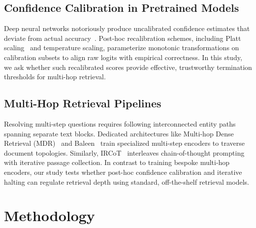 \documentclass{article}
\begin{document}
\subsection{Confidence Calibration in Pretrained Models}
Deep neural networks notoriously produce uncalibrated confidence estimates that deviate from actual accuracy~\cite{guo2017calibration}. Post-hoc recalibration schemes, including Platt scaling~\cite{platt1999probabilistic} and temperature scaling, parameterize monotonic transformations on calibration subsets to align raw logits with empirical correctness. In this study, we ask whether such recalibrated scores provide effective, trustworthy termination thresholds for multi-hop retrieval.

\subsection{Multi-Hop Retrieval Pipelines}
Resolving multi-step questions requires following interconnected entity paths spanning separate text blocks. Dedicated architectures like Multi-hop Dense Retrieval (MDR)~\cite{xiong2021mdr} and Baleen~\cite{khattab2021baleen} train specialized multi-step encoders to traverse document topologies. Similarly, IRCoT~\cite{trivedi2023ircot} interleaves chain-of-thought prompting with iterative passage collection. In contrast to training bespoke multi-hop encoders, our study tests whether post-hoc confidence calibration and iterative halting can regulate retrieval depth using standard, off-the-shelf retrieval models.


\section{Methodology}
\label{sec:method}
\end{document}
